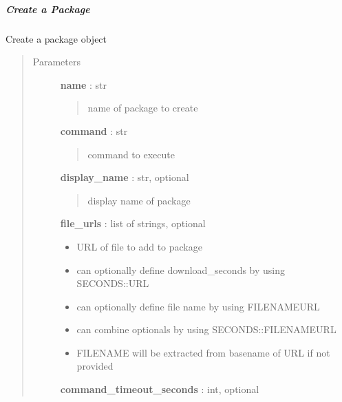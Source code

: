 \documentclass[letterpaper,10pt,english]{sphinxmanual}
\begin{document}
\subparagraph{Create a Package}
\label{pytan.handler:create-a-package}

\begin{fulllineitems}
\label{pytan.handler:pytan.handler.Handler.create_package}
Create a package object
\begin{quote}\begin{description}
\item[{Parameters}] \leavevmode
\textbf{name} : str
\begin{quote}

name of package to create
\end{quote}

\textbf{command} : str
\begin{quote}

command to execute
\end{quote}

\textbf{display\_name} : str, optional
\begin{quote}

display name of package
\end{quote}

\textbf{file\_urls} : list of strings, optional
\begin{itemize}
\item {} 
URL of file to add to package

\item {} 
can optionally define download\_seconds by using SECONDS::URL

\item {} 
can optionally define file name by using FILENAME\textbar{}\textbar{}URL

\item {} 
can combine optionals by using SECONDS::FILENAME\textbar{}\textbar{}URL

\item {} 
FILENAME will be extracted from basename of URL if not provided

\end{itemize}

\textbf{command\_timeout\_seconds} : int, optional
\begin{quote}


\end{quote}
\end{description}
\end{quote}
\end{fulllineitems}
\end{document}
